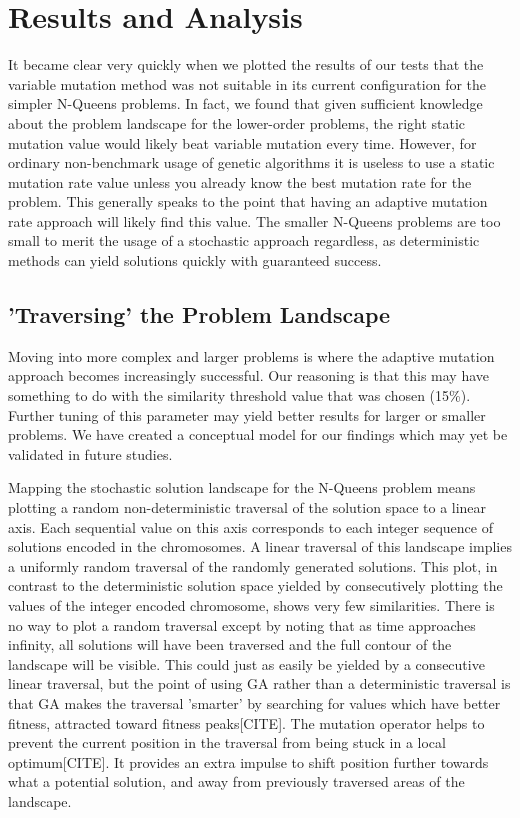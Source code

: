 \documentclass{sig-alternate}
\begin{document}
% 
%
\newpage
\section{Results and Analysis}
It became clear very quickly when we plotted the results of our tests that the variable mutation method was not suitable in its current configuration for the simpler N-Queens problems. In fact, we found that given sufficient knowledge about the problem landscape for the lower-order problems, the right static mutation value would likely beat variable mutation every time. However, for ordinary non-benchmark usage of genetic algorithms it is useless to use a static mutation rate value unless you already know the best mutation rate for the problem. This generally speaks to the point that having an adaptive mutation rate approach will likely find this value. The smaller N-Queens problems are too small to merit the usage of a stochastic approach regardless, as deterministic methods can yield solutions quickly with guaranteed success.

\subsection{'Traversing' the Problem Landscape}
Moving into more complex and larger problems is where the adaptive mutation approach becomes increasingly successful. Our reasoning is that this may have something to do with the similarity threshold value that was chosen (15\%). Further tuning of this parameter may yield better results for larger or smaller problems. We have created a conceptual model for our findings which may yet be validated in future studies.

Mapping the stochastic solution landscape for the N-Queens problem means plotting a random non-deterministic traversal of the solution space to a linear axis. Each sequential value on this axis corresponds to each integer sequence of solutions encoded in the chromosomes. A linear traversal of this landscape implies a uniformly random traversal of the randomly generated solutions. This plot, in contrast to the deterministic solution space yielded by consecutively plotting the values of the integer encoded chromosome, shows very few similarities. There is no way to plot a random traversal except by noting that as time approaches infinity, all solutions will have been traversed and the full contour of the landscape will be visible. This could just as easily be yielded by a consecutive linear traversal, but the point of using GA rather than a deterministic traversal is that GA makes the traversal 'smarter' by searching for values which have better fitness, attracted toward fitness peaks[CITE]. The mutation operator helps to prevent the current position in the traversal from being stuck in a local optimum[CITE]. It provides an extra impulse to shift position further towards what a potential solution, and away from previously traversed areas of the landscape.
\end{document}
